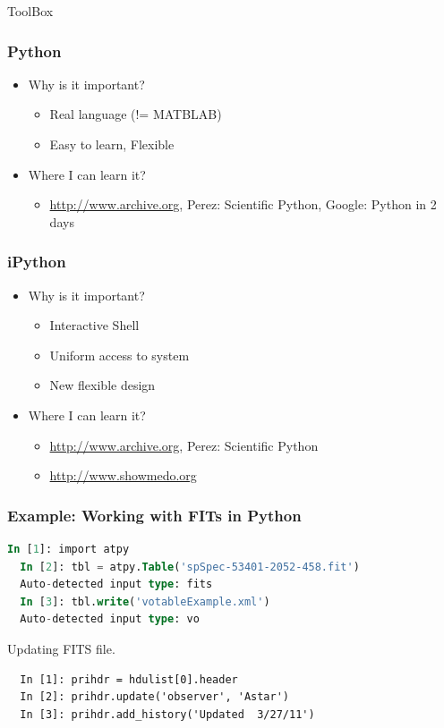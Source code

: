 \documentclass[fleqn]{beamer}
\begin{document}
\begin{section}{ToolBox}
  \begin{frame}\frametitle{Python}
  \begin{itemize}
    \item{Why is it important?}
      \begin{itemize}
      \item Real language (!= MATBLAB)
      \item Easy to learn, Flexible
      \end{itemize}
    \item{Where I can learn it?}
      \begin{itemize}
      \item \url{http://www.archive.org}, Perez: Scientific Python,
        Google: Python in 2 days
      \end{itemize}
  \end{itemize}
  \end{frame}



  \begin{frame}\frametitle{iPython}
  \begin{itemize}
    \item{Why is it important?}
      \begin{itemize}
      \item Interactive Shell
      \item Uniform access to system
      \item New flexible design
      \end{itemize}
    \item{Where I can learn it?}
      \begin{itemize}
      \item \url{http://www.archive.org}, Perez: Scientific Python
      \item \url{http://www.showmedo.org}
      \end{itemize}
  \end{itemize}
  \end{frame}

\begin{frame}[containsverbatim]\frametitle{Example: Working with FITs
    in Python}
\begin{lstlisting}[language=SQL]
  In [1]: import atpy
  In [2]: tbl = atpy.Table('spSpec-53401-2052-458.fit')
  Auto-detected input type: fits
  In [3]: tbl.write('votableExample.xml')
  Auto-detected input type: vo
\end{lstlisting}
Updating FITS file.

\begin{lstlisting}
  In [1]: prihdr = hdulist[0].header
  In [2]: prihdr.update('observer', 'Astar')
  In [3]: prihdr.add_history('Updated  3/27/11')
\end{lstlisting}


\end{frame}
\end{section}
\end{document}
